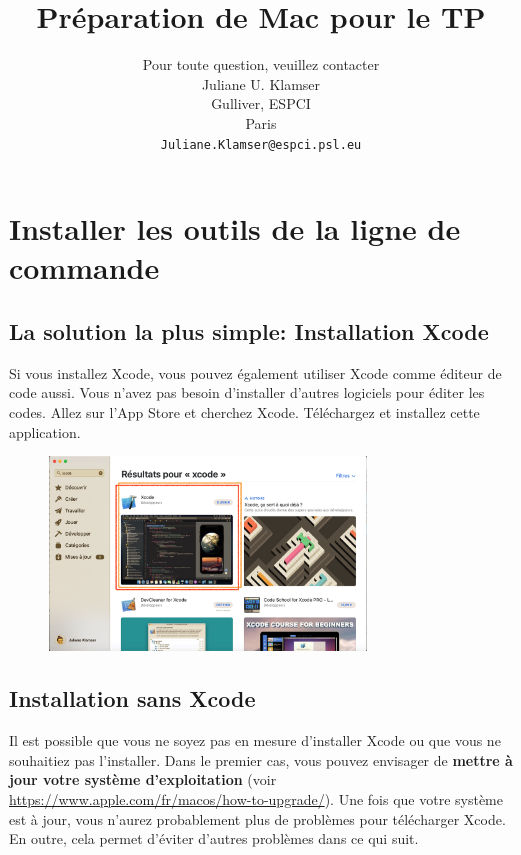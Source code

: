 \documentclass{article}
\title{Préparation de Mac pour le TP}
\author{
Pour toute question, veuillez contacter\\
 Juliane U. Klamser\\%
  Gulliver,  ESPCI\\
  Paris \\
  \texttt{Juliane.Klamser@espci.psl.eu} \\
}
\begin{document}
\maketitle

\tableofcontents



\newpage
\section{Installer les outils de la ligne de commande}
\subsection{La solution la plus simple: Installation Xcode}
Si vous installez Xcode, vous pouvez également utiliser Xcode comme éditeur de code aussi. Vous n'avez pas besoin d'installer d'autres logiciels pour éditer les codes.
Allez sur l'App Store et cherchez Xcode. Téléchargez et installez cette application.
\begin{figure}[H]
\center
\includegraphics[width=0.75\textwidth]{Plots/AppStoreXcode.png}
\end{figure}
\subsection{Installation sans Xcode\label{S:CommandLineWithoutX}}
Il est possible que vous ne soyez pas en mesure d'installer Xcode ou que vous ne souhaitiez pas l'installer.  Dans le premier cas, vous pouvez envisager de \textbf{mettre à jour votre système d'exploitation} (voir \href{https://www.apple.com/fr/macos/how-to-upgrade/}{https://www.apple.com/fr/macos/how-to-upgrade/}). Une fois que votre système est à jour, vous n'aurez probablement plus de problèmes pour télécharger Xcode.  En outre, cela permet d'éviter d'autres problèmes dans ce qui suit.
\end{document}
